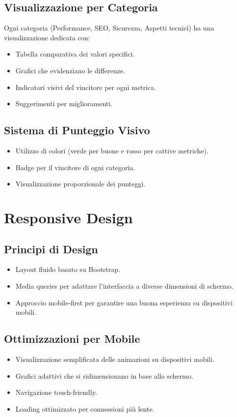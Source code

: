 \subsection{Visualizzazione per Categoria}
Ogni categoria (Performance, SEO, Sicurezza, Aspetti tecnici) ha una visualizzazione dedicata con:
\begin{itemize}
    \item Tabella comparativa dei valori specifici.
    \item Grafici che evidenziano le differenze.
    \item Indicatori visivi del vincitore per ogni metrica.
    \item Suggerimenti per miglioramenti.
\end{itemize}

\subsection{Sistema di Punteggio Visivo}
\begin{itemize}
    \item Utilizzo di colori (verde per buone e rosso per cattive metriche).
    \item Badge per il vincitore di ogni categoria.
    \item Visualizzazione proporzionale dei punteggi.
\end{itemize}

\section{Responsive Design}

\subsection{Principi di Design}
\begin{itemize}
    \item Layout fluido basato su Bootstrap.
    \item Media queries per adattare l'interfaccia a diverse dimensioni di schermo.
    \item Approccio mobile-first per garantire una buona esperienza su dispositivi mobili.
\end{itemize}

\subsection{Ottimizzazioni per Mobile}
\begin{itemize}
    \item Visualizzazione semplificata delle animazioni su dispositivi mobili.
    \item Grafici adattivi che si ridimensionano in base allo schermo.
    \item Navigazione touch-friendly.
    \item Loading ottimizzato per connessioni più lente.
\end{itemize}

